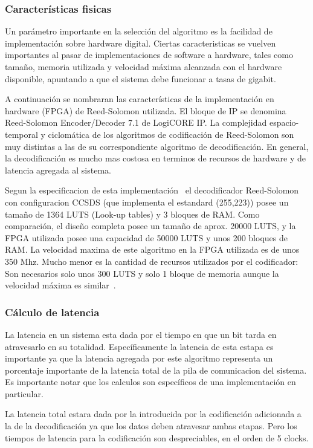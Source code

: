 \subsubsection{Características fisicas}
Un parámetro importante en la selección del algoritmo es la facilidad de implementación sobre hardware digital. Ciertas caracteristicas se vuelven importantes al pasar de implementaciones de software a hardware, tales como tamaño, memoria utilizada y velocidad máxima alcanzada con el hardware disponible, apuntando a que el sistema debe funcionar a tasas de gigabit.

A continuación se nombraran las características de la implementación en hardware (FPGA) de Reed-Solomon utilizada.
El bloque de IP se denomina Reed-Solomon Encoder/Decoder 7.1 de LogiCORE IP. La complejidad espacio-temporal y ciclomática de los algoritmos de codificación de Reed-Solomon son muy distintas a las de su correspondiente algoritmo de decodificación. En general, la decodificación es mucho mas costosa en terminos de recursos de hardware y de latencia agregada al sistema.

Segun la especificacion de esta implementación~\cite{Xilinx:DS252} el decodificador Reed-Solomon con configuracion CCSDS (que implementa el estandard (255,223)) posee un tamaño de 1364 LUTS (Look-up tables) y 3 bloques de RAM. Como comparación, el diseño completa posee un tamaño de aprox. 20000 LUTS, y la FPGA utilizada posee una capacidad de 50000 LUTS y unos 200 bloques de RAM. La velocidad maxima de este algoritmo en la FPGA utilizada es de unos 350 Mhz.
Mucho menor es la cantidad de recursos utilizados por el codificador: Son necesarios solo unos 300 LUTS y solo 1 bloque de memoria aunque la velocidad máxima es similar~\cite{Xilinx:DS251}.

\subsubsection{Cálculo de latencia}
La latencia en un sistema esta dada por el tiempo en que un bit tarda en atravesarlo en su totalidad. Específicamente la latencia de esta estapa es importante ya que la latencia agregada por este algoritmo representa un porcentaje importante de la latencia total de la pila de comunicacion del sistema. Es importante notar que los calculos son específicos de una implementación en particular. 

La latencia total estara dada por la introducida por la codificación adicionada a la de la decodificación ya que los datos deben atravesar ambas etapas. Pero los tiempos de latencia para la codificación son despreciables, en el orden de 5 clocks. 

